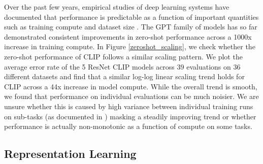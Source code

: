 Over the past few years, empirical studies of deep learning systems have documented that performance is predictable as a function of important quantities such as training compute and dataset size \cite{hestness2017deep,kaplan2020scaling}. The GPT family of models has so far demonstrated consistent improvements in zero-shot performance across a 1000x increase in training compute. In Figure \ref{zeroshot_scaling}, we check whether the zero-shot performance of CLIP follows a similar scaling pattern. We plot the average error rate of the 5 ResNet CLIP models across 39 evaluations on 36 different datasets and find that a similar log-log linear scaling trend holds for CLIP across a 44x increase in model compute. While the overall trend is smooth, we found that performance on individual evaluations can be much noisier. We are unsure whether this is caused by high variance between individual training runs on sub-tasks (as documented in \citet{d2020underspecification}) masking a steadily improving trend or whether performance is actually non-monotonic as a function of compute on some tasks.

\subsection{Representation Learning}
\label{linear_probe_section}

